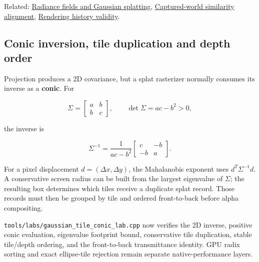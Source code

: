 Related: \hyperref[appendix-c5b332e400e7]{Radiance fields and Gaussian splatting}, \hyperref[appendix-5f40b4fea463]{Captured-world similarity alignment}, \hyperref[appendix-2e7e9fd28a2c]{Rendering history validity}.

\subsection{Conic inversion, tile duplication and depth order}\label{conic-inversion-tile-duplication-and-depth-order}

Projection produces a 2D covariance, but a splat rasterizer normally consumes its inverse as a \textbf{conic}. For

\[
\Sigma=
\begin{bmatrix}
a&b\\
b&c
\end{bmatrix},
\qquad
\det\Sigma=ac-b^2>0,
\]

the inverse is

\[
\Sigma^{-1}
=
\frac{1}{ac-b^2}
\begin{bmatrix}
c&-b\\
-b&a
\end{bmatrix}.
\]

For a pixel displacement \(d=(\Delta x,\Delta y)\), the Mahalanobis exponent uses \(d^T\Sigma^{-1}d\). A conservative screen radius can be built from the largest eigenvalue of \(\Sigma\); the resulting box determines which tiles receive a duplicate splat record. Those records must then be grouped by tile and ordered front-to-back before alpha compositing.

\texttt{tools/labs/gaussian\_tile\_conic\_lab.cpp} now verifies the 2D inverse, positive conic evaluation, eigenvalue footprint bound, conservative tile duplication, stable tile/depth ordering, and the front-to-back transmittance identity. GPU radix sorting and exact ellipse-tile rejection remain separate native-performance layers.

